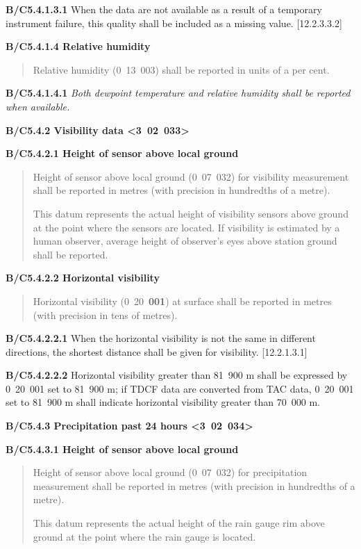 \textbf{B/C5.4.1.3.1} When the data are not available as a result of a temporary instrument failure, this quality shall be included as a missing value. {[}12.2.3.3.2{]}

\textbf{B/C5.4.1.4 Relative humidity}

\begin{quote}
Relative humidity (0~13~003) shall be reported in units of a per cent.
\end{quote}

\textbf{B/C5.4.1.4.1} \emph{Both dewpoint temperature and relative humidity shall be reported when available.}

\textbf{B/C5.4.2 Visibility data \textless3~02~033\textgreater{}}

\textbf{B/C5.4.2.1 Height of sensor above local ground}

\begin{quote}
Height of sensor above local ground (0~07~032) for visibility measurement shall be reported in metres (with precision in hundredths of a metre).

This datum represents the actual height of visibility sensors above ground at the point where the sensors are located. If visibility is estimated by a human observer, average height of observer's eyes above station ground shall be reported.
\end{quote}

\textbf{B/C5.4.2.2 Horizontal visibility}

\begin{quote}
Horizontal visibility (0~20~\textbf{001}) at surface shall be reported in metres (with precision in tens of metres).
\end{quote}

\textbf{B/C5.4.2.2.1} When the horizontal visibility is not the same in different directions, the shortest distance shall be given for visibility. {[}12.2.1.3.1{]}

\textbf{B/C5.4.2.2.2} Horizontal visibility greater than 81~900 m shall be expressed by 0~20~001 set to 81~900 m; if TDCF data are converted from TAC data, 0~20~001 set to 81~900 m shall indicate horizontal visibility greater than 70~000 m.

\textbf{B/C5.4.3 Precipitation past 24 hours \textless3~02~034\textgreater{}}

\textbf{B/C5.4.3.1 Height of sensor above local ground}

\begin{quote}
Height of sensor above local ground (0~07~032) for precipitation measurement shall be reported in metres (with precision in hundredths of a metre).

This datum represents the actual height of the rain gauge rim above ground at the point where the rain gauge is located.
\end{quote}

